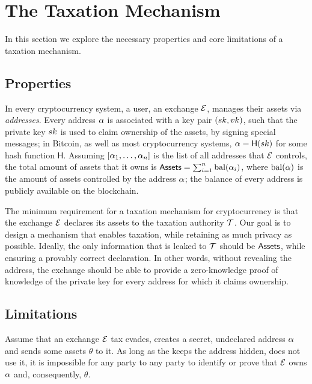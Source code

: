\section{The Taxation Mechanism}\label{sec:taxation}

In this section we explore the necessary properties and core limitations of a
taxation mechanism.

\subsection{Properties}\label{subsec:tax-properties}

In every cryptocurrency system, a user, \eg an exchange $\mathcal{E}$, manages
their assets via \emph{addresses}. Every address $\alpha$ is associated with
a key pair $(sk, vk)$, such that the private key $sk$ is used to claim
ownership of the assets, \eg by signing special messages; in Bitcoin, as well
as most cryptocurrency systems, $\alpha = \mathsf{H}(sk)$ for some hash
function $\mathsf{H}$.  Assuming $[\alpha_1, \dots, \alpha_n]$ is the list
of all addresses that $\mathcal{E}$ controls, the total amount of assets that it
owns is $\mathsf{Assets} = \sum_{i=1}^n \text{bal}(\alpha_i)$, where
$\text{bal}(\alpha)$ is the amount of assets controlled by the address
$\alpha$; the balance of every address is publicly available on the
blockchain.

The minimum requirement for a taxation mechanism for cryptocurrency is that the
exchange $\mathcal{E}$ declares its assets to the taxation authority $\mathcal{T}$.
Our goal is to design a mechanism that enables taxation, while retaining as
much privacy as possible. Ideally, the only information that is leaked to
$\mathcal{T}$ should be $\mathsf{Assets}$, while ensuring a provably correct declaration.
In other words, without revealing the address, the exchange should be able to
provide a zero-knowledge proof of knowledge of the private key for every
address for which it claims ownership.

\subsection{Limitations}\label{subsec:tax-limitations}

Assume that an exchange $\mathcal{E}$ tax evades, \ie creates a secret,
undeclared address $\alpha$ and sends some assets $\theta$ to it. As long as
the keeps the address hidden, \ie does not use it, it is impossible for any
party to any party to identify or prove that $\mathcal{E}$ owns $\alpha$ and,
consequently, $\theta$.

